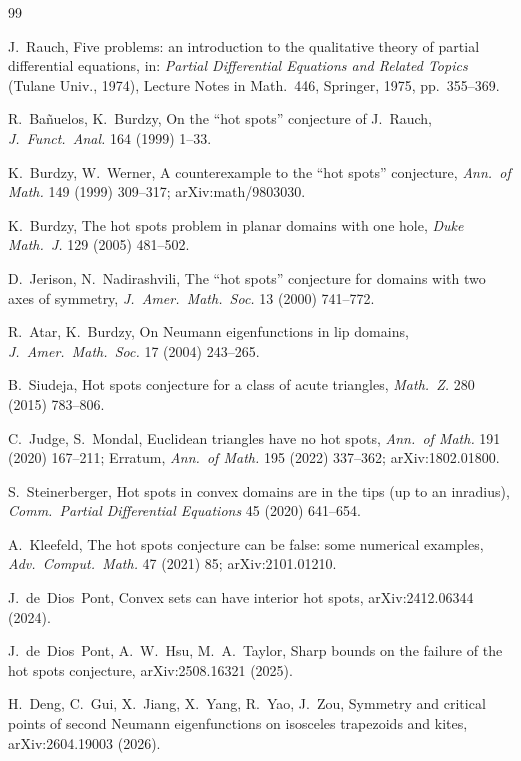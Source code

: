 \documentclass[11pt]{article}
\begin{document}
\begin{thebibliography}{99}\small

 J.~Rauch, Five problems: an introduction to the
qualitative theory of partial differential equations, in:
\emph{Partial Differential Equations and Related Topics} (Tulane
Univ., 1974), Lecture Notes in Math.\ 446, Springer, 1975, pp.~355--369.

 R.~Ba\~nuelos, K.~Burdzy, On the ``hot
spots'' conjecture of J.~Rauch, \emph{J.\ Funct.\ Anal.} 164 (1999)
1--33.

 K.~Burdzy, W.~Werner, A counterexample to the
``hot spots'' conjecture, \emph{Ann.\ of Math.} 149 (1999) 309--317;
arXiv:math/9803030.

 K.~Burdzy, The hot spots problem in planar
domains with one hole, \emph{Duke Math.\ J.} 129 (2005) 481--502.

 D.~Jerison, N.~Nadirashvili, The ``hot
spots'' conjecture for domains with two axes of symmetry, \emph{J.\
Amer.\ Math.\ Soc.} 13 (2000) 741--772.

 R.~Atar, K.~Burdzy, On Neumann eigenfunctions in
lip domains, \emph{J.\ Amer.\ Math.\ Soc.} 17 (2004) 243--265.

 B.~Siudeja, Hot spots conjecture for a class of
acute triangles, \emph{Math.\ Z.} 280 (2015) 783--806.

 C.~Judge, S.~Mondal, Euclidean triangles have no
hot spots, \emph{Ann.\ of Math.} 191 (2020) 167--211; Erratum,
\emph{Ann.\ of Math.} 195 (2022) 337--362; arXiv:1802.01800.

 S.~Steinerberger, Hot spots in convex domains
are in the tips (up to an inradius), \emph{Comm.\ Partial Differential
Equations} 45 (2020) 641--654.

 A.~Kleefeld, The hot spots conjecture can be false:
some numerical examples, \emph{Adv.\ Comput.\ Math.} 47 (2021) 85;
arXiv:2101.01210.

 J.~de~Dios~Pont, Convex sets can have interior hot
spots, arXiv:2412.06344 (2024).

 J.~de~Dios~Pont, A.~W.~Hsu, M.~A.~Taylor, Sharp bounds
on the failure of the hot spots conjecture, arXiv:2508.16321 (2025).

 H.~Deng, C.~Gui, X.~Jiang, X.~Yang, R.~Yao, J.~Zou,
Symmetry and critical points of second Neumann eigenfunctions on
isosceles trapezoids and kites, arXiv:2604.19003 (2026).


\end{thebibliography}
\end{document}

